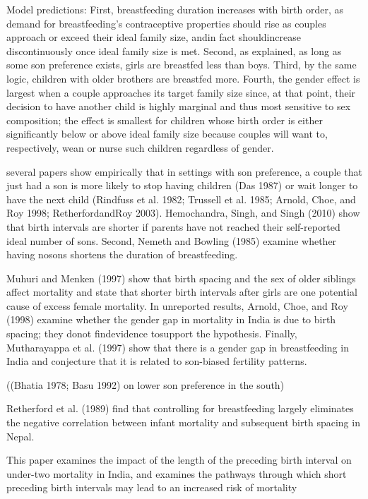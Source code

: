 Model predictions:
First, breastfeeding duration increases with birth order, as demand for
breastfeeding’s contraceptive properties should rise as couples approach
or exceed their ideal family size, andin fact shouldincrease
discontinuously once ideal family size is met.
Second, as explained, as long as some son preference exists, girls are
breastfed less than boys.
Third, by the same logic, children with older brothers are breastfed more.
Fourth, the gender effect is largest when a couple approaches its target
family size since, at that point, their decision to have another child
is highly marginal and thus most sensitive to sex composition; the
effect is smallest for children whose birth order is either
significantly below or above ideal family size because couples will want
to, respectively, wean or nurse such children regardless of gender.

several papers show empirically that in settings with son preference, a
couple that just had a son is more likely to stop having children (Das
1987) or wait longer to have the next child (Rindfuss et al. 1982;
Trussell et al. 1985; Arnold, Choe, and Roy 1998; RetherfordandRoy
2003). Hemochandra, Singh, and Singh (2010) show that birth intervals
are shorter if parents have not reached their self-reported ideal number
of sons. Second, Nemeth and Bowling (1985) examine whether having nosons
shortens the duration of breastfeeding.

Muhuri and Menken (1997) show that birth spacing and the sex of older
siblings affect mortality and state that shorter birth intervals after
girls are one potential cause of excess female mortality. In unreported
results, Arnold, Choe, and Roy (1998) examine whether the gender gap in
mortality in India is due to birth spacing; they donot findevidence
tosupport the hypothesis. Finally, Mutharayappa et al. (1997) show that
there is a gender gap in breastfeeding in India and conjecture that it
is related to son-biased fertility patterns.

((Bhatia 1978; Basu 1992) on lower son preference in the south)

Retherford et al. (1989) find that controlling for breastfeeding largely
eliminates the negative correlation between infant mortality and
subsequent birth spacing in Nepal.

\citep{Whitworth2002}

This paper examines the impact of the length of the preceding birth
interval on under-two mortality in India, and examines the pathways
through which short preceding birth intervals may lead to an increased
risk of mortality

